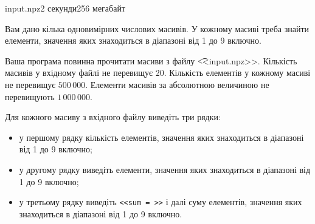 \begin{problem}{}{input.npz}{}{2 секунди}{256 мегабайт}

Вам дано кілька одновимірних числових масивів. 
У кожному масиві треба знайти елементи, значення яких знаходиться в діапазоні від 1 до 9 включно.

\InputFile
Ваша програма повинна прочитати масиви з файлу {\t {<<input.npz>>}}.
Кількість масивів у вхідному файлі не перевищує 20.
Кількість елементів у кожному масиві не перевищує $500\,000$.
Елементи масивів за абсолютною величиною не перевищують $1\,000\,000$.

\OutputFile
Для кожного масиву з вхідного файлу виведіть три рядки:
\begin{itemize} 
\item у першому рядку кількість елементів, значення яких знаходиться в діапазоні від 1 до 9 включно;
\item у другому рядку виведіть елементи, значення яких знаходиться в діапазоні від 1 до 9 включно;
\item у третьому рядку виведіть \texttt{<<sum = >>} і далі суму елементів, значення яких знаходиться в діапазоні від 1 до 9 включно.
\end{itemize}


\Example
\begin{example}
%
\end{example}

\end{problem}

